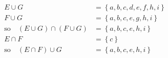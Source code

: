 \documentclass[addpoints,12pt]{exam}
\begin{document}
\begin{questions}
\begin{solution}
\begin{align*}
E\cup G&=\left\{a,b,c,d,e,f,h,i\right\}\\
F\cup G&=\left\{a,b,c,e,g,h,i\right\}\\
\text{so}\quad
\left(E\cup G\right)\cap\left(F\cup G\right)
&=\left\{a,b,c,e,h,i\right\}\\
E\cap F&=\left\{c\right\}\\
\text{so}\quad\left(E\cap F\right)\cup G
&=\left\{a,b,c,e,h,i\right\}
\end{align*}
\end{solution}
\end{questions}
\end{document}
